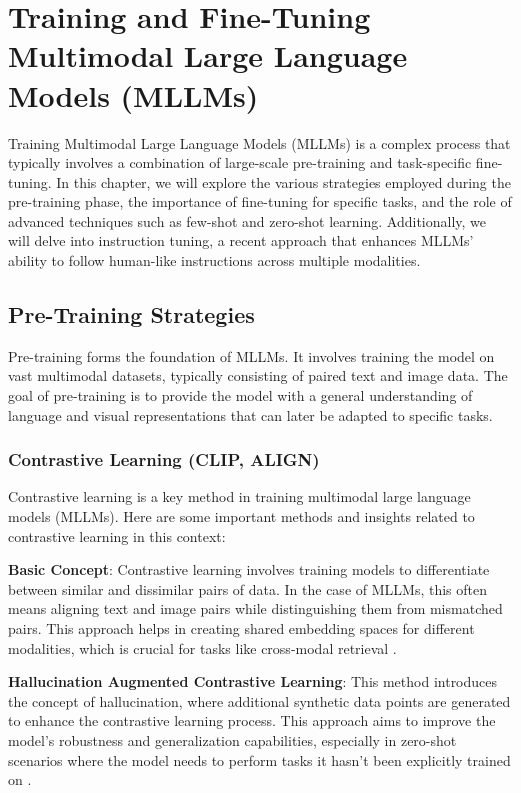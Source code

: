 \chapter{Training and Fine-Tuning Multimodal Large Language Models (MLLMs)}



Training Multimodal Large Language Models (MLLMs) is a complex process that typically involves a combination of large-scale pre-training and task-specific fine-tuning. In this chapter, we will explore the various strategies employed during the pre-training phase, the importance of fine-tuning for specific tasks, and the role of advanced techniques such as few-shot and zero-shot learning. Additionally, we will delve into instruction tuning, a recent approach that enhances MLLMs' ability to follow human-like instructions across multiple modalities.

\section{Pre-Training Strategies}

Pre-training forms the foundation of MLLMs. It involves training the model on vast multimodal datasets, typically consisting of paired text and image data. The goal of pre-training is to provide the model with a general understanding of language and visual representations that can later be adapted to specific tasks.

\subsection{Contrastive Learning (CLIP, ALIGN)}

Contrastive learning is a key method in training multimodal large language models (MLLMs). Here are some important methods and insights related to contrastive learning in this context:

\textbf{Basic Concept}: Contrastive learning involves training models to differentiate between similar and dissimilar pairs of data. In the case of MLLMs, this often means aligning text and image pairs while distinguishing them from mismatched pairs. This approach helps in creating shared embedding spaces for different modalities, which is crucial for tasks like cross-modal retrieval \cite{cite4}.

\textbf{Hallucination Augmented Contrastive Learning}: This method introduces the concept of hallucination, where additional synthetic data points are generated to enhance the contrastive learning process. This approach aims to improve the model's robustness and generalization capabilities, especially in zero-shot scenarios where the model needs to perform tasks it hasn't been explicitly trained on \cite{cite1, cite2}.

